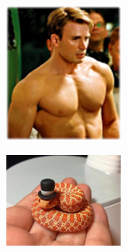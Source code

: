 \documentclass[11pt]{exam}
\begin{document}
\begin{questions}
\begin{figure}[h]
    \centering
    \begin{subfigure}[b]{0.3\textwidth}
\addtocounter{subfigure}{3}
        \includegraphics[width=\textwidth]{cute4}
        \caption{\underline{\hspace{2cm}}} 
        \label{fig:dude}
    \end{subfigure}
    \begin{subfigure}[b]{0.3\textwidth}
        \includegraphics[width=\textwidth]{cute5}

\end{subfigure}
\end{figure}
\end{questions}
\end{document}
